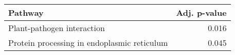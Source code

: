 \begin{tabular}{lr}
\toprule
                                     Pathway &  Adj. p-value \\
\midrule
                  Plant-pathogen interaction &         0.016 \\
 Protein processing in endoplasmic reticulum &         0.045 \\
\bottomrule
\end{tabular}
